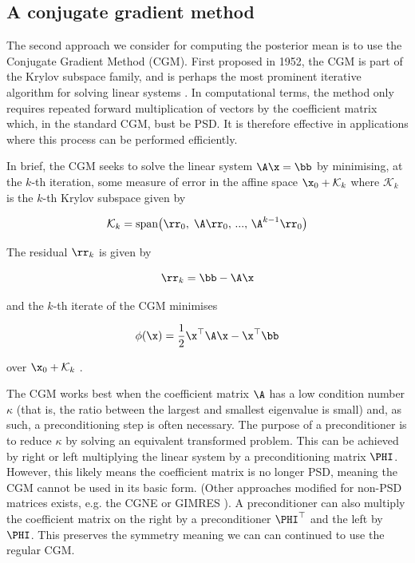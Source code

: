 \subsection{A conjugate gradient method}

\label{sec:CGM}

The second approach we consider for computing the posterior mean is to use the Conjugate Gradient Method (CGM). First proposed in 1952, the CGM is part of the Krylov subspace family, and is perhaps the most prominent iterative algorithm for solving linear systems \citep{Hestenes1952}. In computational terms, the method only requires repeated forward multiplication of vectors by the coefficient matrix which, in the standard CGM, bust be PSD. It is therefore effective in applications where this process can be performed efficiently. 

In brief, the CGM seeks to solve the linear system $\A \x = \bb$ by minimising, at the $k$-th iteration, some measure of error in the affine space $\x_0 + \mathcal{K}_k$ where $\mathcal{K}_k$ is the $k$-th Krylov subspace given by  

$$
\mathcal{K}_k = \text{span}\big(\rr_0, \; \A \rr_0, \, ..., \, \A^{k-1} \rr_0 \big)
$$

The residual $\rr_k$ is given by 

$$
\rr_k = \bb - \A \x
$$

and the $k$-th iterate of the CGM minimises 

$$
\phi(\x) = \frac{1}{2} \x^\top \A \x  - \x^\top \bb
$$

over $\x_0 + \mathcal{K}_k$ \citep{Kelley1995}. 

The CGM works best when the coefficient matrix $\A$ has a low condition number $\kappa$ (that is, the ratio between the largest and smallest eigenvalue is small) and, as such, a preconditioning step is often necessary. The purpose of a preconditioner is to reduce $\kappa$ by solving an equivalent transformed problem. This can be achieved by right or left multiplying the linear system by a preconditioning matrix $\PHI$. However, this likely means the coefficient matrix is no longer PSD, meaning the CGM cannot be used in its basic form. (Other approaches modified for non-PSD matrices exists, e.g. the CGNE or GIMRES \citep{Elman1982, Saad1986}). A preconditioner can also multiply the coefficient matrix on the right by a preconditioner $\PHI^\top$ and the left by $\PHI$. This preserves the symmetry meaning we can can continued to use the regular CGM. 

